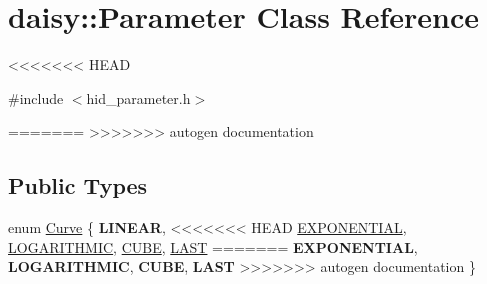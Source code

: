 \hypertarget{classdaisy_1_1_parameter}{}\section{daisy\+:\+:Parameter Class Reference}
\label{classdaisy_1_1_parameter}
<<<<<<< HEAD


{\ttfamily \#include $<$hid\+\_\+parameter.\+h$>$}

=======
>>>>>>> autogen documentation
\subsection*{Public Types}
\begin{DoxyCompactItemize}
\item 
enum \hyperlink{classdaisy_1_1_parameter_a2fcb1b7095721f0de77594aabb9594da}{Curve} \{ \newline
{\bfseries L\+I\+N\+E\+AR}, 
<<<<<<< HEAD
\hyperlink{classdaisy_1_1_parameter_a2fcb1b7095721f0de77594aabb9594daac8edf4df75c87b5f6a76181e4466aee3}{E\+X\+P\+O\+N\+E\+N\+T\+I\+AL}, 
\hyperlink{classdaisy_1_1_parameter_a2fcb1b7095721f0de77594aabb9594daaab531abbd03c5a2fc2290daa5a1f39c0}{L\+O\+G\+A\+R\+I\+T\+H\+M\+IC}, 
\hyperlink{classdaisy_1_1_parameter_a2fcb1b7095721f0de77594aabb9594daacca2d40b7b85d8f2bd10262152aaca92}{C\+U\+BE}, 
\newline
\hyperlink{classdaisy_1_1_parameter_a2fcb1b7095721f0de77594aabb9594daafd1a0bfdbd74a9f915abd72694b57621}{L\+A\+ST}
=======
{\bfseries E\+X\+P\+O\+N\+E\+N\+T\+I\+AL}, 
{\bfseries L\+O\+G\+A\+R\+I\+T\+H\+M\+IC}, 
{\bfseries C\+U\+BE}, 
\newline
{\bfseries L\+A\+ST}
>>>>>>> autogen documentation
 \}
\end{DoxyCompactItemize}

